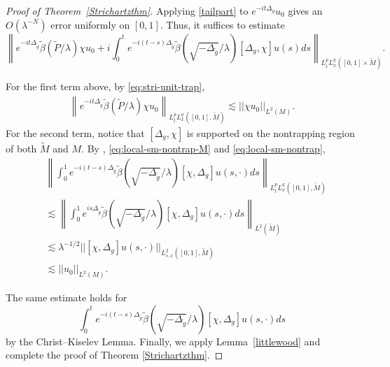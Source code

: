 \documentclass[11pt]{amsart}
\newcommand{\la}{\lambda}
\begin{document}
\begin{proof}[Proof of Theorem~\ref{Strichartzthm}]
    Applying \eqref{tailpart} to $e^{-it\Delta_g}u_0$ gives an $O(\la^{-N})$ error uniformly on $[0,1]$. Thus, it suffices to estimate 
    \begin{equation*}
        \left\|e^{-it\Delta_{\tilde g}}\tilde\beta(\tilde P/\la)\chi u_0+i\int^{t}_0e^{-i(t-s)\Delta_{\tilde g}}\tilde\beta(\sqrt{-\Delta_{\tilde g}}/\la)[\Delta_g,\chi]u(s) ds\right\|_{L^p_tL^q_x([0,1]\times \tilde M)}.
    \end{equation*}

    For the first term above, by \eqref{eq:stri-unit-trap},
\begin{align*}
        \left\|e^{-it\Delta_{\tilde g}}\tilde\beta(\tilde P/\la)\chi u_0\right\|_{L^p_tL^q_x([0,1],\tilde M)}\lesssim||\chi u_0||_{L^2(M)}.
    \end{align*}
For the second term, notice that $[\Delta_g,\chi]$ is supported on the nontrapping region of both $\tilde M$ and $M.$ By \cite[Theorem 1.1]{HSTZ}, \eqref{eq:local-sm-nontrap-M} and \eqref{eq:local-sm-nontrap}, 
     \begin{align*}
       &\left\|\int_0^1e^{-i(t-s)\Delta_{\tilde g}}\tilde \beta(\sqrt{-\Delta_{\tilde g}}/\la)[\chi,\Delta_g]u(s,\cdot)ds\right\|_{L^p_tL^q_x([0,1],\tilde M)}\\
       &\lesssim\left\|\int_0^1e^{is\Delta_{\tilde g}}\tilde \beta(\sqrt{-\Delta_{\tilde g}}/\la)[\chi,\Delta_g]u(s,\cdot)ds\right\|_{L^2(\tilde M)}\\
       &\lesssim\lambda^{-1/2}||[\chi,\Delta_g]u(s,\cdot)||_{L^2_{s,x}([0,1],\tilde M)}\\
       &\lesssim||u_0||_{L^2(M)}.
    \end{align*}
   
    The same estimate holds for $$\int_0^te^{-i(t-s)\Delta_{\tilde g}}\tilde \beta(\sqrt{-\Delta_{\tilde g}}/\la)[\chi,\Delta_g]u(s,\cdot)ds$$ by the Christ--Kiselev Lemma.
    Finally, we apply Lemma~\ref{littlewood} and complete the proof of Theorem \ref{Strichartzthm}.
\end{proof}
\end{document}
